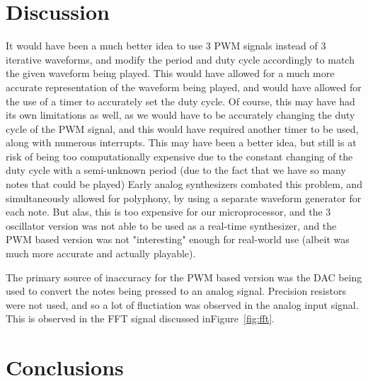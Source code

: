\documentclass[10pt]{article}
\begin{document}



\section{Discussion}\label{sec:discussion}


It would have been a much better idea to use 3 PWM signals instead of 3 iterative waveforms, and modify the period and duty cycle accordingly to match the given waveform being played.
This would have allowed for a much more accurate representation of the waveform being played, and would have allowed for the use of a timer to accurately set the duty cycle.
Of course, this may have had its own limitations as well, as we would have to be accurately changing the duty cycle of the PWM signal, and this would have required another timer to be used, along with numerous interrupts.
This may have been a better idea, but still is at risk of being too computationally expensive due to the constant changing of the duty cycle with a semi-unknown period (due to the fact that we have so many notes that could be played)
Early analog synthesizers combated this problem, and simultaneously allowed for polyphony, by using a separate waveform generator for each note.
But alas, this is too expensive for our microprocessor, and the 3 oscillator version was not able to be used as a real-time synthesizer, and the PWM based version was not "interesting" enough for real-world use (albeit was much more accurate and actually playable).

The primary source of inaccuracy for the PWM based version was the DAC being used to convert the notes being pressed to an analog signal.
Precision resistors were not used, and so a lot of fluctiation was observed in the analog input signal.
This is observed in the FFT signal discussed inFigure~\ref{fig:fft}.

\section{Conclusions}\label{sec:conclusions}

\end{document}
